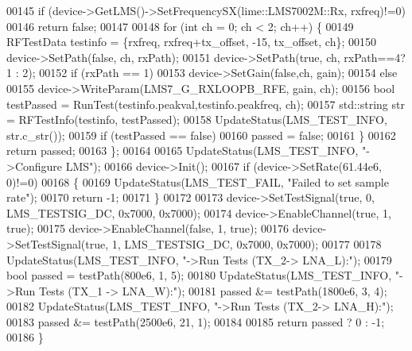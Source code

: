 \begin{DoxyCode}
00145         \textcolor{keywordflow}{if} (device->GetLMS()->SetFrequencySX(lime::LMS7002M::Rx, rxfreq)!=0)
00146             \textcolor{keywordflow}{return} \textcolor{keyword}{false};
00147 
00148         \textcolor{keywordflow}{for} (\textcolor{keywordtype}{int} ch = 0; ch < 2; ch++) \{
00149             RFTestData testinfo = \{rxfreq, rxfreq+tx\_offset, -15, tx\_offset, ch\};
00150             device->SetPath(\textcolor{keyword}{false}, ch, rxPath);
00151             device->SetPath(\textcolor{keyword}{true}, ch, rxPath==4? 1 : 2);
00152             \textcolor{keywordflow}{if} (rxPath == 1)
00153                 device->SetGain(\textcolor{keyword}{false},ch, gain);
00154             \textcolor{keywordflow}{else}
00155                 device->WriteParam(LMS7_G_RXLOOPB_RFE, gain, ch);
00156             \textcolor{keywordtype}{bool} testPassed = RunTest(testinfo.peakval,testinfo.peakfreq, ch);
00157             std::string str = RFTestInfo(testinfo, testPassed);
00158             UpdateStatus(LMS_TEST_INFO, str.c\_str());
00159             \textcolor{keywordflow}{if} (testPassed == \textcolor{keyword}{false})
00160                 passed = \textcolor{keyword}{false};
00161         \}
00162         \textcolor{keywordflow}{return} passed;
00163     \};
00164 
00165     UpdateStatus(LMS_TEST_INFO, \textcolor{stringliteral}{"->Configure LMS"});
00166     device->Init();
00167     \textcolor{keywordflow}{if} (device->SetRate(61.44e6, 0)!=0)
00168     \{
00169         UpdateStatus(LMS_TEST_FAIL, \textcolor{stringliteral}{"Failed to set sample rate"});
00170         \textcolor{keywordflow}{return} -1;
00171     \}
00172 
00173     device->SetTestSignal(\textcolor{keyword}{true}, 0, LMS_TESTSIG_DC, 0x7000, 0x7000);
00174     device->EnableChannel(\textcolor{keyword}{true}, 1, \textcolor{keyword}{true});
00175     device->EnableChannel(\textcolor{keyword}{false}, 1, \textcolor{keyword}{true});
00176     device->SetTestSignal(\textcolor{keyword}{true}, 1, LMS_TESTSIG_DC, 0x7000, 0x7000);
00177 
00178     UpdateStatus(LMS_TEST_INFO, \textcolor{stringliteral}{"->Run Tests (TX\_2-> LNA\_L):"});
00179     \textcolor{keywordtype}{bool} passed = testPath(800e6, 1, 5);
00180     UpdateStatus(LMS_TEST_INFO, \textcolor{stringliteral}{"->Run Tests (TX\_1 -> LNA\_W):"});
00181     passed &= testPath(1800e6, 3, 4);
00182     UpdateStatus(LMS_TEST_INFO, \textcolor{stringliteral}{"->Run Tests (TX\_2-> LNA\_H):"});
00183     passed &= testPath(2500e6, 21, 1);
00184 
00185     \textcolor{keywordflow}{return} passed ? 0 : -1;
00186 \}
\end{DoxyCode}
